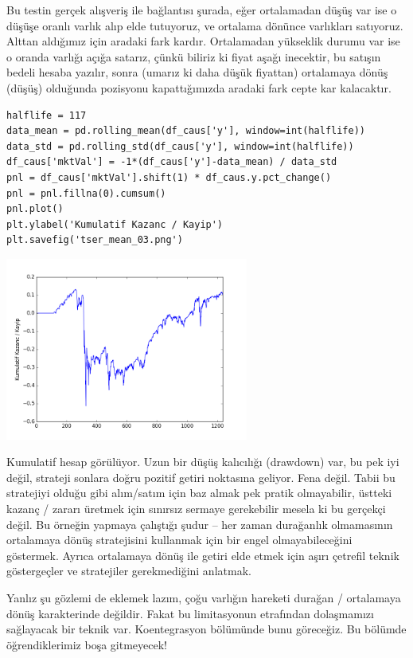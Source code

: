 \documentclass[12pt,fleqn]{article}\usepackage{../../common}
\begin{document}
Bu testin gerçek alışveriş ile bağlantısı şurada, eğer ortalamadan düşüş
var ise o düşüşe oranlı varlık alıp elde tutuyoruz, ve ortalama dönünce
varlıkları satıyoruz. Alttan aldığımız için aradaki fark
kardır. Ortalamadan yükseklik durumu var ise o oranda varlığı açığa
satarız, çünkü biliriz ki fiyat aşağı inecektir, bu satışın bedeli hesaba
yazılır, sonra (umarız ki daha düşük fiyattan) ortalamaya dönüş (düşüş)
olduğunda pozisyonu kapattığımızda aradaki fark cepte kar kalacaktır.

\begin{verbatim}
halflife = 117
data_mean = pd.rolling_mean(df_caus['y'], window=int(halflife))
data_std = pd.rolling_std(df_caus['y'], window=int(halflife))
df_caus['mktVal'] = -1*(df_caus['y']-data_mean) / data_std
pnl = df_caus['mktVal'].shift(1) * df_caus.y.pct_change()
pnl = pnl.fillna(0).cumsum()
pnl.plot()
plt.ylabel('Kumulatif Kazanc / Kayip')
plt.savefig('tser_mean_03.png')
\end{verbatim}

\includegraphics[height=6cm]{tser_mean_03.png}

Kumulatif hesap görülüyor. Uzun bir düşüş kalıcılığı (drawdown) var, bu pek
iyi değil, strateji sonlara doğru pozitif getiri noktasına geliyor. Fena
değil. Tabii bu stratejiyi olduğu gibi alım/satım için baz almak pek pratik
olmayabilir, üstteki kazanç / zararı üretmek için sınırsız sermaye gerekebilir
mesela ki bu gerçekçi değil. Bu örneğin yapmaya çalıştığı şudur -- her zaman
durağanlık olmamasının ortalamaya dönüş stratejisini kullanmak için bir engel
olmayabileceğini göstermek. Ayrıca ortalamaya dönüş ile getiri elde etmek için
aşırı çetrefil teknik göstergeçler ve stratejiler gerekmediğini anlatmak.

Yanlız şu gözlemi de eklemek lazım, çoğu varlığın hareketi durağan /
ortalamaya dönüş karakterinde değildir. Fakat bu limitasyonun etrafından
dolaşmamızı sağlayacak bir teknik var. Koentegrasyon bölümünde bunu
göreceğiz. Bu bölümde öğrendiklerimiz boşa gitmeyecek!
\end{document}
